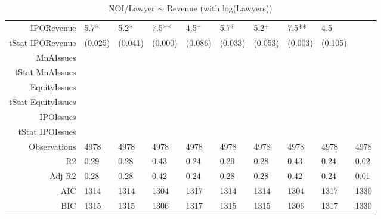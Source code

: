 \begin{table}[ht]
\begin{tabular}{rlllllllll}
  IPORevenue & 5.7* & 5.2* & 7.5** & 4.5$^{+}$ & 5.7* & 5.2$^{+}$ & 7.5** & 4.5 &  \\ 
  tStat IPORevenue & (0.025) & (0.041) & (0.000) & (0.086) & (0.033) & (0.053) & (0.003) & (0.105) &  \\ 
  MnAIssues &  &  &  &  &  &  &  &  &  \\ 
  tStat MnAIssues &  &  &  &  &  &  &  &  &  \\ 
  EquityIssues &  &  &  &  &  &  &  &  &  \\ 
  tStat EquityIssues &  &  &  &  &  &  &  &  &  \\ 
  IPOIssues &  &  &  &  &  &  &  &  &  \\ 
  tStat IPOIssues &  &  &  &  &  &  &  &  &  \\ 
  Observations & 4978 & 4978 & 4978 & 4978 & 4978 & 4978 & 4978 & 4978 & 4978 \\ 
  R2 & 0.29 & 0.28 & 0.43 & 0.24 & 0.29 & 0.28 & 0.43 & 0.24 & 0.02 \\ 
  Adj R2 & 0.28 & 0.28 & 0.42 & 0.24 & 0.28 & 0.28 & 0.42 & 0.24 & 0.01 \\ 
  AIC & 1314 & 1314 & 1304 & 1317 & 1314 & 1314 & 1304 & 1317 & 1330 \\ 
  BIC & 1315 & 1315 & 1306 & 1317 & 1315 & 1315 & 1306 & 1317 & 1330 \\ 
   \hline
\end{tabular}
\caption{NOI/Lawyer $\sim$ Revenue (with log(Lawyers))} 
\end{table}
